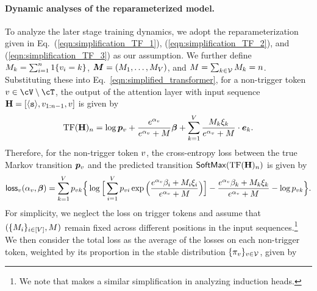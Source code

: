 \paragraph{Dynamic analyses of the reparameterized model.} To analyze the later stage training dynamics, we adopt the reparameterization given in Eq.~(\ref{eqn:simplification_TF_1}), (\ref{eqn:simplification_TF_2}), and (\ref{eqn:simplification_TF_3}) as our assumption. We further define $M_{k} = \sum_{i = 1}^n 1\{ v_i = k \}$, $\bm{M} = (M_1, \ldots, M_V)$, and $M = \sum_{k \in \mathcal{V}} M_{k} = n$. Substituting these into Eq.~\eqref{eqn:simplified_transformer}, for a non-trigger token $v \in \cV \setminus \cT$, the output of the attention layer with input sequence ${\mathbf H} = [\texttt{$\langle \texttt{s}\rangle$}, v_{1:n-1}, v]$ is given by 
\begin{equation}\label{eqn:q}
{\rm TF}({\mathbf H})_n = \log \bm{p}_v + \frac{e^{\alpha_v}}{e^{\alpha_v} + M} \boldsymbol{\beta} + \sum_{k=1}^{V} \frac{M_k \xi_k}{e^{\alpha_v} + M} \cdot \bm{e}_k.
\end{equation}
Therefore, for the non-trigger token $v$, the cross-entropy loss between the true Markov transition $\bm{p}_v$ and the predicted transition ${\sf SoftMax}({\rm TF}({\mathbf H})_n)$ is given by
\begin{equation}\label{eqn:loss_single}
\mathsf{loss}_v(\alpha_v, \boldsymbol{\beta}) = \sum_{k=1}^V p_{vk}\Big\{ \log \Big[ \sum_{i=1}^V p_{vi} \exp\Big(\frac{e^{\alpha_v}\beta_i+M_i\xi_i}{e^{\alpha_v}+M}\Big) \Big] - \frac{e^{\alpha_v}\beta_k+M_k\xi_k}{e^{\alpha_v}+M} - \log p_{vk} \Big\}.
\end{equation}
For simplicity, we neglect the loss on trigger tokens and assume that $(\{ M_i \}_{i \in [V]}, M)$ remain fixed across different positions in the input sequences.\footnote{We note that \cite{reddy2023mechanistic} makes a similar simplification in analyzing induction heads.} We then consider the total loss as the average of the losses on each non-trigger token, weighted by its proportion in the stable distribution $\{\pi_v\}_{v \in \mathcal{V}}$, given by
